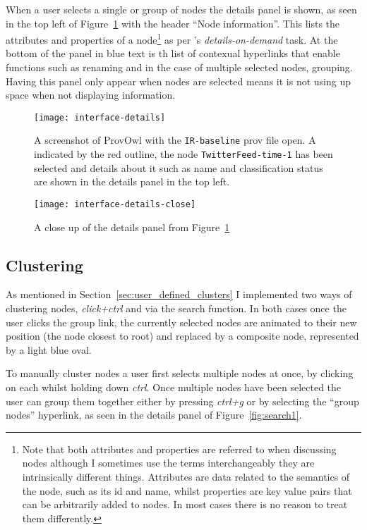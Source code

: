 When a user selects a single or group of nodes the details panel is shown, as seen in the top left of Figure~\ref{fig:interface-details} with the header ``Node information''. This lists the attributes and properties of a node\footnote{Note that both attributes and properties are referred to when discussing nodes although I sometimes use the terms interchangeably they are intrinsically different things. Attributes are data related to the semantics of the node, such as its id and name, whilst properties are key value pairs that can be arbitrarily added to nodes. In most cases there is no reason to treat them differently.} as per \citeauthor{Shneiderman1996}'s \textit{details-on-demand} task. At the bottom of the panel in blue text is th list of contexual hyperlinks that enable functions such as renaming and in the case of multiple selected nodes, grouping. Having this panel only appear when nodes are selected means it is not using up space when not displaying information. 

\begin{figure}[h]
	\centering
	\texttt{[image: interface-details]}
	\caption{A screenshot of ProvOwl with the \texttt{IR-baseline} prov file open. A indicated by the red outline, the node \texttt{TwitterFeed-time-1} has been selected and details about it such as name and classification status are shown in the details panel in the top left.}
	\label{fig:interface-details}
\end{figure}
\begin{figure}[h]
	\centering
	\texttt{[image: interface-details-close]}
	\caption{A close up of the details panel from Figure~\ref{fig:interface-details}}
	\label{fig:key-concepts}
\end{figure}


\subsection{Clustering}
\label{sec:clustering}

As mentioned in Section~\ref{sec:user_defined_clusters} I implemented two ways of clustering nodes, \textit{click+ctrl} and via the search function. In both cases once the user clicks the group link, the currently selected nodes are animated to their new position (the node closest to root) and replaced by a composite node, represented by a light blue oval. 

To manually cluster nodes a user first selects multiple nodes at once, by clicking on each whilst holding down \textit{ctrl}. Once multiple nodes have been selected the user can group them together either by pressing \textit{ctrl+g} or by selecting the ``group nodes'' hyperlink, as seen in the details panel of Figure~\ref{fig:search1}.

